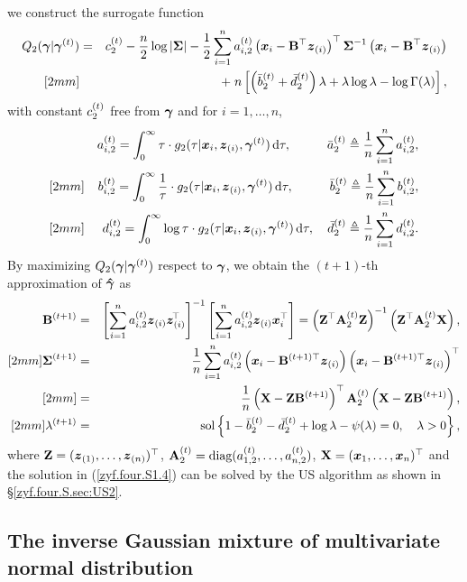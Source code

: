 we construct the surrogate function 
\begin{eqnarray*}
    Q_2({\boldsymbol{\gamma}} | {\boldsymbol{\gamma}}^{(t)}) &=& c^{(t)}_{2} - \frac{n}{2} \log|{\mbox{\boldmath$\Sigma$}}| - \frac{1}{2} \sum_{i=1}^n a^{(t)}_{i,2} \left({\boldsymbol{x}}_i - {\bf B}^\top {\boldsymbol{z}}_{(i)} \right)^\top {\mbox{\boldmath$\Sigma$}}^{-1} \left({\boldsymbol{x}}_i - {\bf B}^\top {\boldsymbol{z}}_{(i)} \right) \\ [2mm]
    && +\; n \left[ \left(\bar{b}_{2}^{(t)} + \bar{d}_{2}^{(t)}\right)\lambda + \lambda\log\lambda - \log\Gamma(\lambda) \right],
\end{eqnarray*}
with constant $c^{(t)}_{2}$ free from ${\boldsymbol{\gamma}}$ and for $i = 1, \dots, n$, 
\begin{eqnarray*}
    && a^{(t)}_{i,2} = \int_0^\infty \tau \cdot g_2(\tau | {\boldsymbol{x}}_i, {\boldsymbol{z}}_{(i)}, {\boldsymbol{\gamma}}^{(t)}) \,\mbox{d} \tau, \hspace{1cm} \bar{a}_{2}^{(t)} \triangleq \frac{1}{n} \sum_{i=1}^{n} a^{(t)}_{i,2}, \\ [2mm]
    && b^{(t)}_{i,2} = \int_0^\infty \frac{1}{\tau} \cdot g_2(\tau | {\boldsymbol{x}}_i, {\boldsymbol{z}}_{(i)}, {\boldsymbol{\gamma}}^{(t)}) \,\mbox{d} \tau, \hspace{1cm} \bar{b}_{2}^{(t)} \triangleq \frac{1}{n} \sum_{i=1}^{n} b^{(t)}_{i,2}, \\ [2mm]
    && d^{(t)}_{i,2} = \int_0^\infty \log\tau \cdot g_2(\tau | {\boldsymbol{x}}_i, {\boldsymbol{z}}_{(i)}, {\boldsymbol{\gamma}}^{(t)}) \,\mbox{d} \tau, \quad \bar{d}_{2}^{(t)} \triangleq \frac{1}{n} \sum_{i=1}^{n} d^{(t)}_{i,2}.
\end{eqnarray*}
By maximizing $Q_2({\boldsymbol{\gamma}} | {\boldsymbol{\gamma}}^{(t)})$ respect to ${\boldsymbol{\gamma}}$, we obtain the $(t+1)$-th approximation of $\boldsymbol{\hat{\gamma}}$ as
\begin{eqnarray}
    {\bf B}^{(t+1)} &=& \left[ \sum_{i=1}^n a^{(t)}_{i,2} {\boldsymbol{z}}_{(i)} {\boldsymbol{z}}_{(i)}^{\!\top\!} \right]^{-1} \left[ \sum_{i=1}^n a^{(t)}_{i,2} {\boldsymbol{z}}_{(i)} {\boldsymbol{x}}_i^\top \right] = \left({\bf Z}^\top {\bf A}_{2}^{(t)} {\bf Z}\right)^{-1} \left({\bf Z}^\top {\bf A}_{2}^{(t)} {\bf X}\right), \nonumber \\ [2mm]
    {\mbox{\boldmath$\Sigma$}}^{(t+1)} &=& \frac{1}{n} \sum_{i=1}^n a^{(t)}_{i,2} \left( {\boldsymbol{x}}_i - {\bf B}^{(t+1)\top} {\boldsymbol{z}}_{(i)}\right) \left( {\boldsymbol{x}}_i - {\bf B}^{(t+1)\top}{\boldsymbol{z}}_{(i)} \right)^\top \nonumber \\ [2mm]
    &=& \frac{1}{n}\left({\bf X} - {\bf Z} {\bf B}^{(t+1)} \right)^\top {\bf A}_{2}^{(t)} \left({\bf X} - {\bf Z} {\bf B}^{(t+1)} \right), \nonumber \\ [2mm]
    \lambda^{(t+1)} &=& \mbox{sol}\left\{ 1 - \bar{b}_{2}^{(t)} - \bar{d}_{2}^{(t)} + \log\lambda - \psi(\lambda) = 0, \quad \lambda > 0 \right\}, \label{zyf.four.S1.4}
\end{eqnarray}
where ${\bf Z} = ({\boldsymbol{z}}_{(1)}, \dots, {\boldsymbol{z}}_{(n)})^\top$, ${\bf A}_{2}^{(t)} = \mbox{diag}(a^{(t)}_{1,2}, \dots, a^{(t)}_{n,2})$, ${\bf X} = ({\boldsymbol{x}}_1, \dots, {\boldsymbol{x}}_n)^\top$ and the solution in (\ref{zyf.four.S1.4}) can be solved by the US algorithm as shown in \S\ref{zyf.four.S.sec:US2}.

\subsection{The inverse Gaussian mixture of multivariate normal distribution}       %

